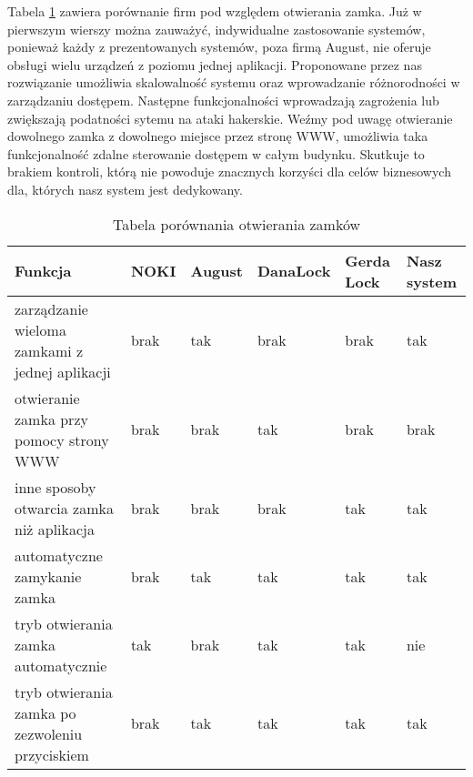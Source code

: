 Tabela \ref{tab:porownanie1} zawiera porównanie firm pod względem otwierania zamka. Już w pierwszym wierszy można zauważyć, indywidualne zastosowanie systemów, ponieważ każdy z prezentowanych systemów, poza firmą August, nie oferuje obsługi wielu urządzeń z poziomu jednej aplikacji. Proponowane przez nas rozwiązanie umożliwia skalowalność systemu oraz wprowadzanie różnorodności w zarządzaniu dostępem. Następne funkcjonalności wprowadzają zagrożenia lub zwiększają podatności sytemu na ataki hakerskie. Weźmy pod uwagę otwieranie dowolnego zamka z dowolnego miejsce przez stronę WWW, umożliwia taka funkcjonalność zdalne sterowanie dostępem w całym budynku. Skutkuje to brakiem kontroli, którą nie powoduje znacznych korzyści dla celów biznesowych dla, których nasz system jest dedykowany.
	\begin{longtable}[!ht]{|p{4cm}|p{1cm}|p{1cm}|p{}|p{1cm}|p{}|} 
		\caption{Tabela porównania otwierania zamków}
		\label{tab:porownanie1}\\
		\hline	
		Funkcja & NOKI & August & DanaLock & Gerda Lock & Nasz system  \\	\hline
		 zarządzanie wieloma zamkami z jednej aplikacji
		 & brak & tak & brak & brak & tak \\	\hline
		otwieranie zamka przy pomocy strony WWW
		& brak & brak & tak & brak & brak \\	\hline
		inne sposoby otwarcia zamka niż aplikacja
		& brak & brak & brak & tak & tak \\	\hline
		automatyczne zamykanie zamka
		& brak & tak & tak & tak & tak \\	\hline
		tryb otwierania zamka automatycznie
		& tak& brak & tak & tak & nie \\	\hline	
		tryb otwierania zamka po zezwoleniu przyciskiem
		& brak & tak & tak & tak & tak \\		\hline
	\end{longtable}

